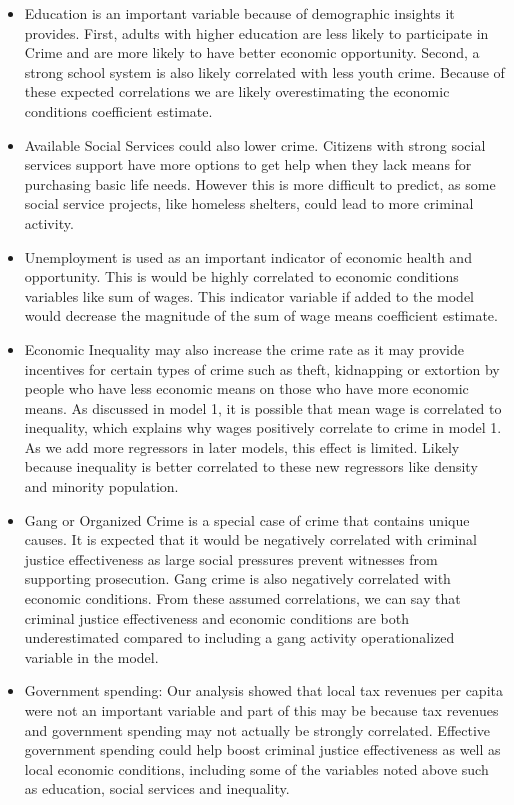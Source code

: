 \documentclass[]{article}
\providecommand{\tightlist}{%
  \setlength{\itemsep}{0pt}\setlength{\parskip}{0pt}}
\begin{document}
\begin{itemize}
\tightlist
\item
  Education is an important variable because of demographic insights it
  provides. First, adults with higher education are less likely to
  participate in Crime and are more likely to have better economic
  opportunity. Second, a strong school system is also likely correlated
  with less youth crime. Because of these expected correlations we are
  likely overestimating the economic conditions coefficient estimate.\\
\item
  Available Social Services could also lower crime. Citizens with strong
  social services support have more options to get help when they lack
  means for purchasing basic life needs. However this is more difficult
  to predict, as some social service projects, like homeless shelters,
  could lead to more criminal activity.\\
\item
  Unemployment is used as an important indicator of economic health and
  opportunity. This is would be highly correlated to economic conditions
  variables like sum of wages. This indicator variable if added to the
  model would decrease the magnitude of the sum of wage means
  coefficient estimate.\\
\item
  Economic Inequality may also increase the crime rate as it may provide
  incentives for certain types of crime such as theft, kidnapping or
  extortion by people who have less economic means on those who have
  more economic means. As discussed in model 1, it is possible that mean
  wage is correlated to inequality, which explains why wages positively
  correlate to crime in model 1. As we add more regressors in later
  models, this effect is limited. Likely because inequality is better
  correlated to these new regressors like density and minority
  population.\\
\item
  Gang or Organized Crime is a special case of crime that contains
  unique causes. It is expected that it would be negatively correlated
  with criminal justice effectiveness as large social pressures prevent
  witnesses from supporting prosecution. Gang crime is also negatively
  correlated with economic conditions. From these assumed correlations,
  we can say that criminal justice effectiveness and economic conditions
  are both underestimated compared to including a gang activity
  operationalized variable in the model.\\
\item
  Government spending: Our analysis showed that local tax revenues per
  capita were not an important variable and part of this may be because
  tax revenues and government spending may not actually be strongly
  correlated. Effective government spending could help boost criminal
  justice effectiveness as well as local economic conditions, including
  some of the variables noted above such as education, social services
  and inequality.
\end{itemize}
\end{document}
